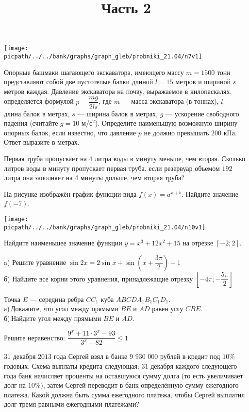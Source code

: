 \begin{training}
\begin{listofex}[resume]
		\begin{center}
			\texttt{[image: \\picpath/../../bank/graphs/graph\_gleb/probniki\_21.04/n7v1]}
		\end{center}
		\foranswer
		\item Опорные башмаки шагающего экскаватора, имеющего массу \( m=1500 \) тонн представляют собой две пустотелые балки длиной \( l=15 \) метров и шириной \( s \) метров каждая. Давление экскаватора на почву, выражаемое в килопаскалях, определяется формулой \( p=\dfrac{mg}{2ls} \), где \( m \) --- масса экскаватора (в тоннах), \( l \) ---длина балок в метрах, \( s \) --- ширина балок в метрах, \( g \) --- ускорение свободного падения (считайте \( g=10 \) м/с\( ^2 \)). Определите наименьшую возможную ширину опорных балок, если известно, что давление \( p \) не должно превышать \( 200 \) кПа. Ответ выразите в метрах.
		\foranswer
		\item Первая труба пропускает на \( 4 \) литра воды в минуту меньше, чем вторая. Сколько литров воды в минуту пропускает первая труба, если резервуар объемом \( 192 \) литра она заполняет на 4 минуты дольше, чем вторая труба?
		\foranswer
		\hphantom{Часть 1}
		\item 
		На рисунке изображён график функции вида \( f(x)=a^{x+b} \). Найдите значение \( f(-7) \).
		\begin{center}
			\texttt{[image: \\picpath/../../bank/graphs/graph\_gleb/probniki\_21.04/n10v1]}
		\end{center}
		\foranswer
		\item Найдите наименьшее значение функции \( y=x^3+12x^2+15 \) на отрезке \( [-2;2] \).
		\foranswer
		\egepreambtwo
		\title{Часть 2}
		\item a) Решите уравнение \( \sin2x=2\sin x + \sin \left( x+\dfrac{ 3\pi }{ 2 } \right)+1\) \\
		б) Найдите все корни этого уравнения, принадлежащие отрезку \( \left[ - 4\pi; -\dfrac{5\pi}{2} \right]  \)
		\hphantom{Часть 1}
		\item Точка \( E \) --- середина ребра \( CC_1 \) куба \( ABCDA_1B_1C_1D_1 \). \\
		а) Докажите, что угол между прямыми \( BE \) и \( AD \) равен углу \( CBE \).\\		
		б) Найдите угол между прямыми \( BE \) и \( AD \).
		\item Решите неравенство: \( \dfrac{9^x+11\cdot3^x-93}{3^x-82}\le1 \)
		\item \( 31 \) декабря \( 2013 \) года Сергей взял в банке \( 9 \) \(930\) \(000\) рублей в кредит под \( 10\% \) годовых. Схема выплаты кредита следующая: \( 31 \) декабря каждого следующего года банк начисляет проценты на оставшуюся сумму долга (то есть увеличивает долг на \( 10\% \)), затем Сергей переводит в банк определённую сумму ежегодного платежа. Какой должна быть сумма ежегодного платежа, чтобы Сергей выплатил долг тремя равными ежегодными платежами?

\end{listofex}
\end{training}
